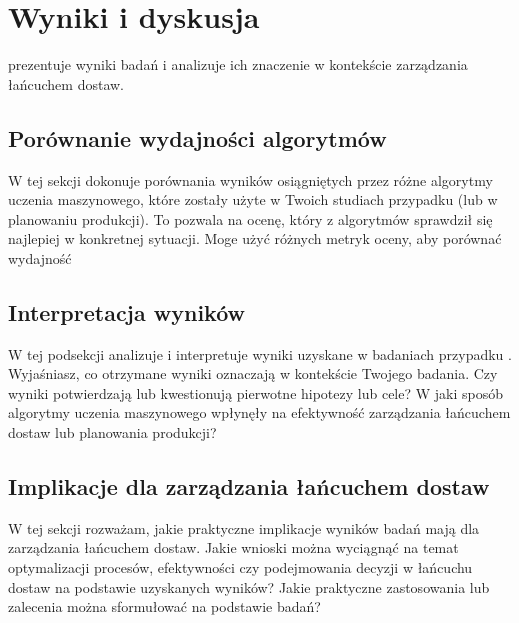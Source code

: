 \newpage %
\section{Wyniki i dyskusja}
 prezentuje wyniki badań i analizuje ich znaczenie w kontekście zarządzania łańcuchem dostaw. 

\subsection{Porównanie wydajności algorytmów}
W tej sekcji dokonuje porównania wyników osiągniętych przez różne algorytmy uczenia maszynowego, które zostały użyte w Twoich studiach przypadku (lub w planowaniu produkcji). To pozwala na ocenę, który z algorytmów sprawdził się najlepiej w konkretnej sytuacji. Moge użyć różnych metryk oceny, aby porównać wydajność

\subsection{Interpretacja wyników}
W tej podsekcji analizuje i interpretuje wyniki uzyskane w badaniach przypadku . Wyjaśniasz, co otrzymane wyniki oznaczają w kontekście Twojego badania. Czy wyniki potwierdzają lub kwestionują pierwotne hipotezy lub cele? W jaki sposób algorytmy uczenia maszynowego wpłynęły na efektywność zarządzania łańcuchem dostaw lub planowania produkcji?

\subsection{Implikacje dla zarządzania łańcuchem dostaw}
W tej sekcji rozważam, jakie praktyczne implikacje wyników badań mają dla zarządzania łańcuchem dostaw. Jakie wnioski można wyciągnąć na temat optymalizacji procesów, efektywności czy podejmowania decyzji w łańcuchu dostaw na podstawie uzyskanych wyników? Jakie praktyczne zastosowania lub zalecenia można sformułować na podstawie  badań?

